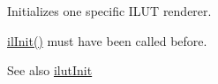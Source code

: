 Initializes one specific I\+L\+U\+T renderer. 

\hyperlink{group__setup_gac4eeea2ec690f1c38ba24c9a0b284811}{il\+Init()} must have been called before.

\begin{DoxySeeAlso}{See also}
\hyperlink{ilut_8h_a0ff2d8eaf788cfbeca6a3b01c05b463a}{ilut\+Init} 
\end{DoxySeeAlso}
